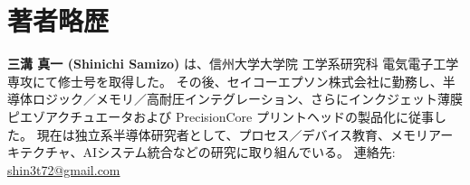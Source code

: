 \documentclass[conference]{IEEEtran}
\begin{document}
\section*{著者略歴}
\textbf{三溝 真一 (Shinichi Samizo)} は、信州大学大学院 工学系研究科 電気電子工学専攻にて修士号を取得した。  
その後、セイコーエプソン株式会社に勤務し、半導体ロジック／メモリ／高耐圧インテグレーション、さらにインクジェット薄膜ピエゾアクチュエータおよび PrecisionCore プリントヘッドの製品化に従事した。  
現在は独立系半導体研究者として、プロセス／デバイス教育、メモリアーキテクチャ、AIシステム統合などの研究に取り組んでいる。  
連絡先: \href{mailto:shin3t72@gmail.com}{shin3t72@gmail.com}
\end{document}
